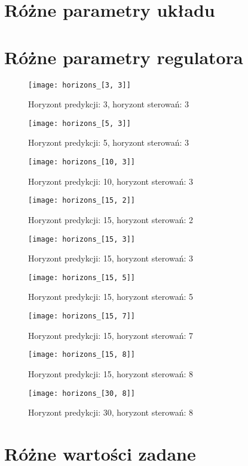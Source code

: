 \section{Różne parametry układu}

\section{Różne parametry regulatora}

\begin{figure}[p]
    \centering
	\texttt{[image: horizons\_[3, 3]]}
	\caption{Horyzont predykcji: 3, horyzont sterowań: 3}
	\label{fig:horizons_3_3}
\end{figure}

\begin{figure}[p]
    \centering
	\texttt{[image: horizons\_[5, 3]]}
	\caption{Horyzont predykcji: 5, horyzont sterowań: 3}
	\label{fig:horizons_5_3}
\end{figure}

\begin{figure}[p]
    \centering
	\texttt{[image: horizons\_[10, 3]]}
	\caption{Horyzont predykcji: 10, horyzont sterowań: 3}
	\label{fig:horizons_10_3}
\end{figure}

\begin{figure}[p]
    \centering
	\texttt{[image: horizons\_[15, 2]]}
	\caption{Horyzont predykcji: 15, horyzont sterowań: 2}
	\label{fig:horizons_15_2}
\end{figure}

\begin{figure}[p]
    \centering
	\texttt{[image: horizons\_[15, 3]]}
	\caption{Horyzont predykcji: 15, horyzont sterowań: 3}
	\label{fig:horizons_15_3}
\end{figure}

\begin{figure}[p]
    \centering
	\texttt{[image: horizons\_[15, 5]]}
	\caption{Horyzont predykcji: 15, horyzont sterowań: 5}
	\label{fig:horizons_15_5}
\end{figure}

\begin{figure}[p]
    \centering
	\texttt{[image: horizons\_[15, 7]]}
	\caption{Horyzont predykcji: 15, horyzont sterowań: 7}
	\label{fig:horizons_15_7}
\end{figure}

\begin{figure}[p]
    \centering
	\texttt{[image: horizons\_[15, 8]]}
	\caption{Horyzont predykcji: 15, horyzont sterowań: 8}
	\label{fig:horizons_15_8}
\end{figure}

\begin{figure}[p]
    \centering
	\texttt{[image: horizons\_[30, 8]]}
	\caption{Horyzont predykcji: 30, horyzont sterowań: 8}
	\label{fig:horizons_30_8}
\end{figure}

\section{Różne wartości zadane}
